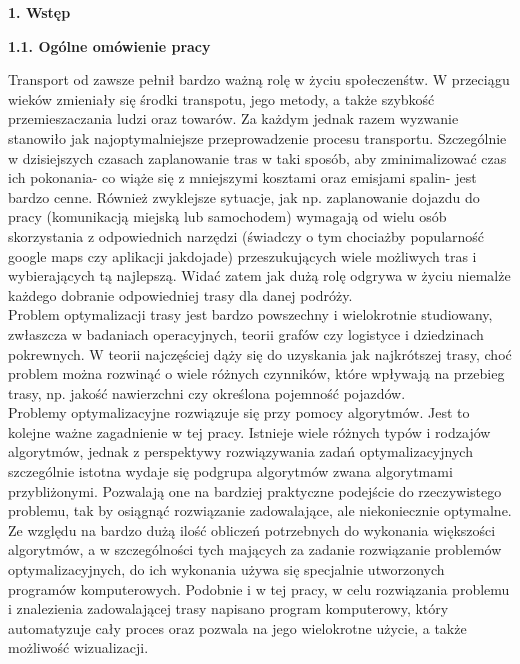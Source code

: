 \documentclass[a4paper, twoside, 12pt, justified]{article}
\begin{document}
		
	\begin{flushleft}
		\begin{LARGE}
			\textbf{1. Wstęp }
		\end{LARGE}
	\end{flushleft}
	
	\begin{flushleft}
		\begin{large}
			\textbf{1.1. Ogólne omówienie pracy}
		\end{large}
	\end{flushleft}
	\vspace{5mm} %
	
	Transport od zawsze pełnił bardzo ważną rolę w życiu społeczenśtw. W przeciągu wieków zmieniały się środki transpotu, jego metody, a także szybkość przemieszaczania ludzi oraz towarów. Za każdym jednak razem wyzwanie stanowiło jak najoptymalniejsze przeprowadzenie procesu transportu.
	Szczególnie w dzisiejszych czasach zaplanowanie tras w taki sposób, aby zminimalizować czas ich pokonania- co wiąże się z mniejszymi kosztami oraz emisjami spalin- jest bardzo cenne. Również zwyklejsze sytuacje, jak np. zaplanowanie dojazdu do pracy (komunikacją miejską lub samochodem) wymagają od wielu osób skorzystania z odpowiednich narzędzi (świadczy o tym chociażby popularność google maps czy aplikacji jakdojade) przeszukujących wiele możliwych tras i wybierających tą najlepszą. Widać zatem jak dużą rolę odgrywa w życiu niemalże każdego dobranie odpowiedniej trasy dla danej podróży.\\ 
	
	Problem optymalizacji trasy jest bardzo powszechny i wielokrotnie studiowany, zwłaszcza w badaniach operacyjnych, teorii grafów czy logistyce i dziedzinach pokrewnych. W teorii najczęściej dąży się do uzyskania jak najkrótszej trasy, choć problem można rozwinąć o wiele różnych czynników, które wpływają na przebieg trasy, np. jakość nawierzchni czy określona pojemność pojazdów.\\
	
	Problemy optymalizacyjne rozwiązuje się przy pomocy algorytmów. Jest to kolejne ważne zagadnienie w tej pracy. Istnieje wiele różnych typów i rodzajów algorytmów, jednak z perspektywy rozwiązywania zadań optymalizacyjnych szczególnie istotna wydaje się podgrupa algorytmów zwana algorytmami przybliżonymi. Pozwalają one na bardziej praktyczne podejście do rzeczywistego problemu, tak by osiągnąć rozwiązanie zadowalające, ale niekoniecznie optymalne.
	Ze względu na bardzo dużą ilość obliczeń potrzebnych do wykonania większości algorytmów, a w szczególności tych mających za zadanie rozwiązanie problemów optymalizacyjnych, do ich wykonania używa się specjalnie utworzonych programów komputerowych. Podobnie i w tej pracy, w celu rozwiązania problemu i znalezienia zadowalającej trasy napisano program komputerowy, który automatyzuje cały proces oraz pozwala na jego wielokrotne użycie, a także możliwość wizualizacji.\\ 
	
\end{document}
